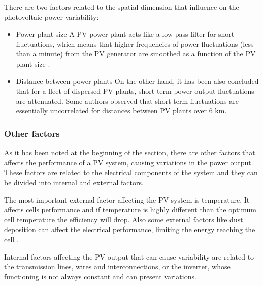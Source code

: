 There are two factors related to the spatial dimension that influence on the photovoltaic power variability:

\begin{itemize}
\item {Power plant size}
  A PV power plant acts like a low-pass filter for short-fluctuations, which means that higher frequencies of power fluctuations (less than a minute) from the PV generator are smoothed as a function of the PV plant size \cite*{Perpinan2011, Perpinan2013}.
\item {Distance between power plants}
  On the other hand, it has been also concluded that for a fleet of dispersed PV plants, short-term power output fluctuations are attenuated. Some authors observed that short-term fluctuations are essentially uncorrelated for distances between PV plants over 6 km.\cite*{Otani1997, Wiemken2001, Hoff2012}
\end{itemize}


\subsubsection{Other factors}

As it has been noted at the beginning of the section, there are other factors that affects the performance of a PV system, causing variations in the power output. These factors are related to the electrical components of the system and they can be divided into internal and external factors.

The most important external factor affecting the PV system is temperature. It affects cells performance and if temperature is highly different than the optimum cell temperature the efficiency will drop. Also some external factors like dust deposition can affect the electrical performance, limiting the energy reaching the cell \cite*{Fan1986, Mekhilef2012,Dubey2013}.

Internal factors affecting the PV output that can cause variability are related to the transmission lines, wires and interconnections, or the inverter, whose functioning is not always constant and can present variations.

